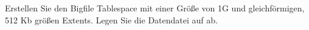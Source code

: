     \item Erstellen Sie den Bigfile Tablespace  mit einer Größe von 1G und gleichförmigen, 512 Kb größen Extents. Legen Sie die Datendatei  auf  ab.
